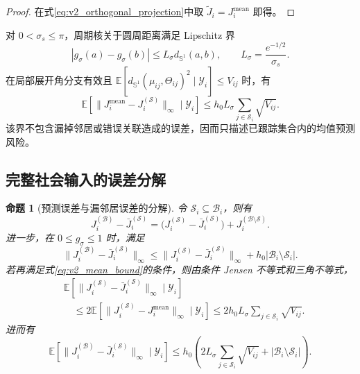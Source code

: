 \documentclass[UTF8,fontset=windows,11pt]{ctexart}
\newtheorem{proposition}[theorem]{命题}
\newcommand{\Sone}{\mathbb S^1}
\newcommand{\E}{\mathbb E}
\begin{document}
\begin{proof}
在式\eqref{eq:v2_orthogonal_projection}中取 $\widetilde J_i=J_i^{\mathrm{mean}}$ 即得。
\end{proof}

对 $0<\sigma_s\le\pi$，周期核关于圆周距离满足 Lipschitz 界
\begin{equation}
 |g_\sigma(a)-g_\sigma(b)|
 \le L_\sigma d_{\Sone}(a,b),
 \qquad L_\sigma=\frac{e^{-1/2}}{\sigma_s}.
 \label{eq:v2_lipschitz_kernel}
\end{equation}
在局部展开角分支有效且 $\E[d_{\Sone}(\mu_{ij},\Theta_{ij})^2\mid\mathcal Y_i]\le V_{ij}$ 时，有
\begin{equation}
 \E[\|J_i^{\mathrm{mean}}-J_i^{(\mathcal S)}\|_\infty\mid\mathcal Y_i]
 \le h_0L_\sigma\sum_{j\in\mathcal S_i}\sqrt{V_{ij}}.
 \label{eq:v2_mean_bound}
\end{equation}
该界不包含漏掉邻居或错误关联造成的误差，因而只描述已跟踪集合内的均值预测风险。

\subsection{完整社会输入的误差分解}

\begin{proposition}[预测误差与漏邻居误差的分解]
\label{prop:v2_full_decomposition}
令 $\mathcal S_i\subseteq\mathcal B_i$，则有
\begin{equation}
 J_i^{(\mathcal B)}-\bar J_i^{(\mathcal S)}
 =\bigl(J_i^{(\mathcal S)}-\bar J_i^{(\mathcal S)}\bigr)
 +J_i^{(\mathcal B\setminus\mathcal S)}.
 \label{eq:v2_full_decomposition}
\end{equation}
进一步，在 $0\le g_\sigma\le1$ 时，满足
\begin{equation}
 \|J_i^{(\mathcal B)}-\bar J_i^{(\mathcal S)}\|_\infty
 \le
 \|J_i^{(\mathcal S)}-\bar J_i^{(\mathcal S)}\|_\infty
 +h_0|\mathcal B_i\setminus\mathcal S_i|.
 \label{eq:v2_full_bound}
\end{equation}
若再满足式\eqref{eq:v2_mean_bound}的条件，则由条件 Jensen 不等式和三角不等式，
\begin{equation}
 \begin{aligned}
 &\E[\|J_i^{(\mathcal S)}-\bar J_i^{(\mathcal S)}\|_\infty\mid\mathcal Y_i]\\
 &\quad\le
 2\E[\|J_i^{(\mathcal S)}-J_i^{\mathrm{mean}}\|_\infty\mid\mathcal Y_i]
 \le2h_0L_\sigma\sum_{j\in\mathcal S_i}\sqrt{V_{ij}}.
 \end{aligned}
 \label{eq:v2_unc_absolute_bound}
\end{equation}
进而有
\begin{equation}
 \E[\|J_i^{(\mathcal B)}-\bar J_i^{(\mathcal S)}\|_\infty\mid\mathcal Y_i]
 \le h_0\left(
 2L_\sigma\sum_{j\in\mathcal S_i}\sqrt{V_{ij}}
 +|\mathcal B_i\setminus\mathcal S_i|
 \right).
 \label{eq:v2_total_input_bound}
\end{equation}
\end{proposition}
\end{document}
